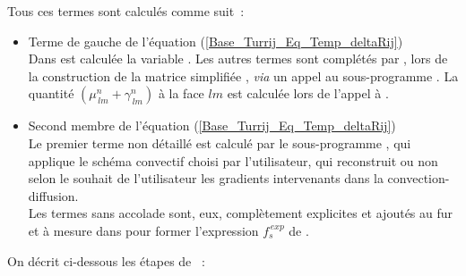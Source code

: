 Tous ces termes sont calculés comme suit~:
\begin{itemize}
\item Terme de gauche de l'équation (\ref{Base_Turrij_Eq_Temp_deltaRij})\\
Dans  est calculée la variable . Les autres
termes sont complétés par , lors de la construction de la matrice simplifiée , {\it via} un
appel au sous-programme . La quantité
 $(\mu^n_{\,lm} + \gamma^n_{\,lm})$ à la face $lm$ est calculée lors de l'appel à
.\\
\item Second membre de l'équation (\ref{Base_Turrij_Eq_Temp_deltaRij})\\
Le premier terme non détaillé est calculé par le sous-programme
, qui applique le schéma convectif choisi par l'utilisateur, qui
reconstruit ou non selon le souhait de l'utilisateur les gradients intervenants
dans la convection-diffusion.\\
Les termes sans accolade sont, eux, complètement explicites et ajoutés au fur et
à mesure dans  pour former
l'expression $f^{\,exp}_s$ de .
\end{itemize}
On décrit ci-dessous les étapes de ~:
